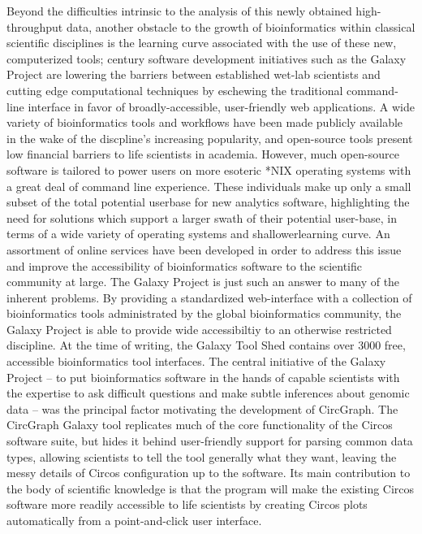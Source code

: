 \documentclass[twocolumn]{article}
\newcommand{\projectName}{CircGraph\xspace}
\begin{document}
Beyond the difficulties intrinsic to the analysis of this newly obtained high-throughput data, another obstacle to the growth of bioinformatics within classical scientific disciplines is the learning curve associated with the use of these new, computerized tools;  century software development initiatives such as the Galaxy Project are lowering the barriers between established wet-lab scientists and cutting edge computational techniques by eschewing the traditional command-line interface in favor of broadly-accessible, user-friendly web applications.\cite{galaxypaper} %
A wide variety of bioinformatics tools and workflows have been made publicly available in the wake of the discpline's increasing popularity, and open-source tools present low financial barriers to life scientists in academia. However, much open-source software is tailored to power users on more esoteric *NIX operating systems with a great deal of command line experience. These individuals make up only a small subset of the total potential userbase for new analytics software, highlighting the need for solutions which support a larger swath of their potential user-base, in terms of a wide variety of operating systems and shallowerlearning curve. An assortment of online services have been developed in order to address this issue and improve the accessibility of bioinformatics software to the scientific community at large. The Galaxy Project is just such an answer to many of the inherent problems. By providing a standardized web-interface with a collection of bioinformatics tools administrated by the global bioinformatics community, the Galaxy Project is able to provide wide accessibiltiy to an otherwise restricted discipline.\cite{galaxypaper} At the time of writing, the Galaxy Tool Shed contains over 3000 free, accessible bioinformatics tool interfaces.\cite{martin-ts} The central initiative of the Galaxy Project -- to put bioinformatics software in the hands of capable scientists with the expertise to ask difficult questions and make subtle inferences about genomic data -- was the principal factor motivating the development of \projectName.\cite{galaxypaper} The \projectName Galaxy tool replicates much of the core functionality of the Circos software suite, but hides it behind user-friendly support for parsing common data types, allowing scientists to tell the tool generally what they want, leaving the messy details of Circos configuration up to the software. Its main contribution to the body of scientific knowledge is that the program will make the existing Circos software more readily accessible to life scientists by creating Circos plots automatically from a point-and-click user interface.
\end{document}
